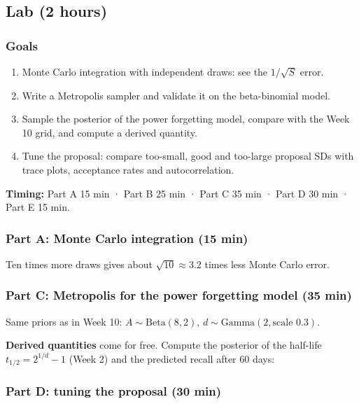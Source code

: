 
\subsection{Lab (2 hours)}

\subsubsection{Goals}

\begin{enumerate}
\def\labelenumi{\arabic{enumi}.}
\tightlist
\item
  Monte Carlo integration with independent draws: see the \(1/\sqrt{S}\)
  error.
\item
  Write a Metropolis sampler and validate it on the beta-binomial model.
\item
  Sample the posterior of the power forgetting model, compare with the
  Week 10 grid, and compute a derived quantity.
\item
  Tune the proposal: compare too-small, good and too-large proposal SDs
  with trace plots, acceptance rates and autocorrelation.
\end{enumerate}

\textbf{Timing:} Part A 15 min · Part B 25 min · Part C 35 min · Part D
30 min · Part E 15 min.

\subsubsection{Part A: Monte Carlo integration (15 min)}

Ten times more draws gives about \(\sqrt{10} \approx 3.2\) times less
Monte Carlo error.

\subsubsection{Part C: Metropolis for the power forgetting model (35
min)}

Same priors as in Week 10: \(A \sim \mathrm{Beta}(8, 2)\),
\(d \sim \mathrm{Gamma}(2, \text{scale } 0.3)\).

\textbf{Derived quantities} come for free. Compute the posterior of the
half-life \(t_{1/2} = 2^{1/d} - 1\) (Week 2) and the predicted recall
after 60 days:

\subsubsection{Part D: tuning the proposal (30 min)}


